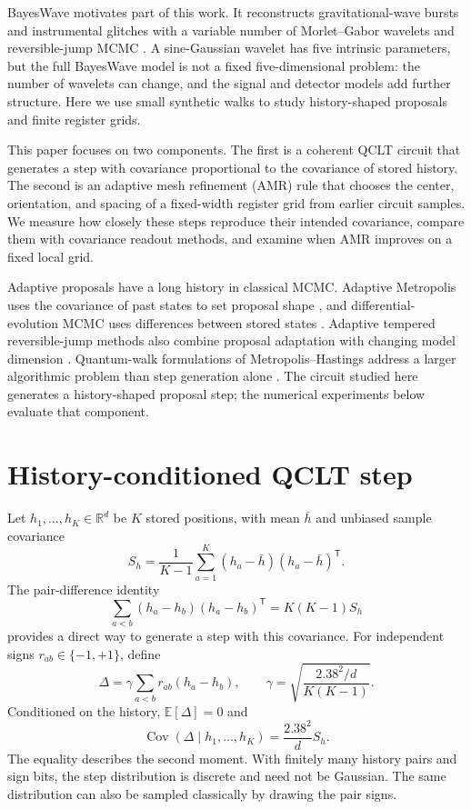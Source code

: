 \documentclass[twocolumn,reprint,aps,prd,floatfix,amsmath,amssymb]{revtex4-2}
\begin{document}
BayesWave motivates part of this work. It reconstructs gravitational-wave bursts and instrumental glitches with a variable number of Morlet--Gabor wavelets and reversible-jump MCMC \cite{cornish2015bayeswave,becsy2017parameter}. A sine-Gaussian wavelet has five intrinsic parameters, but the full BayesWave model is not a fixed five-dimensional problem: the number of wavelets can change, and the signal and detector models add further structure. Here we use small synthetic walks to study history-shaped proposals and finite register grids.

This paper focuses on two components. The first is a coherent QCLT circuit that generates a step with covariance proportional to the covariance of stored history. The second is an adaptive mesh refinement (AMR) rule that chooses the center, orientation, and spacing of a fixed-width register grid from earlier circuit samples. We measure how closely these steps reproduce their intended covariance, compare them with covariance readout methods, and examine when AMR improves on a fixed local grid.

Adaptive proposals have a long history in classical MCMC. Adaptive Metropolis uses the covariance of past states to set proposal shape \cite{haario2001adaptive}, and differential-evolution MCMC uses differences between stored states \cite{terbraak2008demcz}. Adaptive tempered reversible-jump methods also combine proposal adaptation with changing model dimension \cite{tian2024adaptive}. Quantum-walk formulations of Metropolis--Hastings address a larger algorithmic problem than step generation alone \cite{lemieux2020efficient}. The circuit studied here generates a history-shaped proposal step; the numerical experiments below evaluate that component.

\section{History-conditioned QCLT step}

Let $h_1,\ldots,h_K\in\mathbb{R}^d$ be $K$ stored positions, with mean $\bar h$ and unbiased sample covariance
\begin{equation}
  S_h=\frac{1}{K-1}\sum_{a=1}^{K}(h_a-\bar h)(h_a-\bar h)^{\mathsf T}.
\end{equation}
The pair-difference identity
\begin{equation}
  \sum_{a<b}(h_a-h_b)(h_a-h_b)^{\mathsf T}=K(K-1)S_h
\end{equation}
provides a direct way to generate a step with this covariance. For independent signs $r_{ab}\in\{-1,+1\}$, define
\begin{equation}
  \Delta=\gamma\sum_{a<b}r_{ab}(h_a-h_b),\qquad
  \gamma=\sqrt{\frac{2.38^2/d}{K(K-1)}}.
\end{equation}
Conditioned on the history, $\mathbb{E}[\Delta]=0$ and
\begin{equation}
  \operatorname{Cov}(\Delta\mid h_1,\ldots,h_K)=\frac{2.38^2}{d}S_h.
\end{equation}
The equality describes the second moment. With finitely many history pairs and sign bits, the step distribution is discrete and need not be Gaussian. The same distribution can also be sampled classically by drawing the pair signs.
\end{document}
